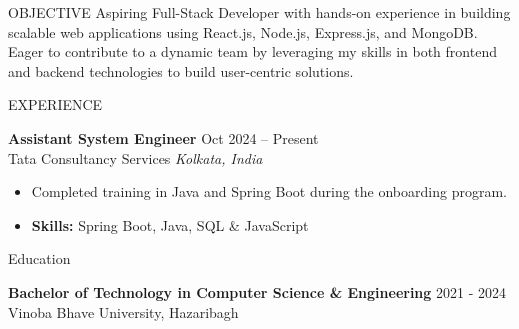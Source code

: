 \documentclass{resume} %
\begin{document}

\begin{rSection}{OBJECTIVE}
Aspiring Full-Stack Developer with hands-on experience in building scalable web applications using React.js, Node.js, Express.js, and MongoDB. Eager to contribute to a dynamic team by leveraging my skills in both frontend and backend technologies to build  user-centric solutions.
\end{rSection}


\begin{rSection}{EXPERIENCE}

\textbf{Assistant System Engineer} \hfill Oct 2024 -- Present\\
Tata Consultancy Services \hfill \textit{Kolkata, India}
 \begin{itemize}
    \itemsep -3pt
    \item Completed training in Java and Spring Boot during the onboarding program.
    \item \textbf{Skills:} {Spring Boot}, {Java}, {SQL} \& {JavaScript}

 \end{itemize}

\end{rSection}





\begin{rSection}{Education}

{\bf Bachelor of Technology in Computer Science \& Engineering}  \hfill {2021 - 2024} \\
Vinoba Bhave University, Hazaribagh

\end{rSection}

\end{document}
